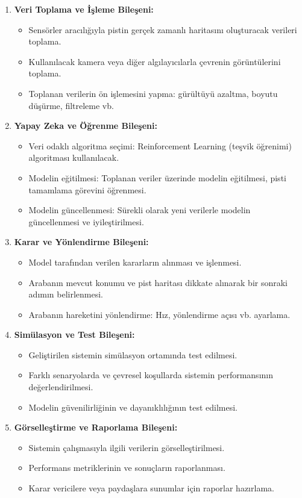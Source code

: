 \begin{enumerate}[label=\textbf{\arabic*.}]
  \item \textbf{Veri Toplama ve İşleme Bileşeni:}
    \begin{itemize}
        \item Sensörler aracılığıyla pistin gerçek zamanlı haritasını oluşturacak verileri toplama.
        \item Kullanılacak kamera veya diğer algılayıcılarla çevrenin görüntülerini toplama.
        \item Toplanan verilerin ön işlemesini yapma: gürültüyü azaltma, boyutu düşürme, filtreleme vb.
    \end{itemize}
  \item \textbf{Yapay Zeka ve Öğrenme Bileşeni:}
    \begin{itemize}
        \item Veri odaklı algoritma seçimi: Reinforcement Learning (teşvik öğrenimi) algoritması kullanılacak.
        \item Modelin eğitilmesi: Toplanan veriler üzerinde modelin eğitilmesi, pisti tamamlama görevini öğrenmesi.
        \item Modelin güncellenmesi: Sürekli olarak yeni verilerle modelin güncellenmesi ve iyileştirilmesi.
    \end{itemize}
  \item \textbf{Karar ve Yönlendirme Bileşeni:}
    \begin{itemize}
        \item Model tarafından verilen kararların alınması ve işlenmesi.
        \item Arabanın mevcut konumu ve pist haritası dikkate alınarak bir sonraki adımın belirlenmesi.
        \item Arabanın hareketini yönlendirme: Hız, yönlendirme açısı vb. ayarlama.
    \end{itemize}
  \item \textbf{Simülasyon ve Test Bileşeni:}
    \begin{itemize}
        \item Geliştirilen sistemin simülasyon ortamında test edilmesi.
        \item Farklı senaryolarda ve çevresel koşullarda sistemin performansının değerlendirilmesi.
        \item Modelin güvenilirliğinin ve dayanıklılığının test edilmesi.
    \end{itemize}
  \item \textbf{Görselleştirme ve Raporlama Bileşeni:}
    \begin{itemize}
        \item Sistemin çalışmasıyla ilgili verilerin görselleştirilmesi.
        \item Performans metriklerinin ve sonuçların raporlanması.
        \item Karar vericilere veya paydaşlara sunumlar için raporlar hazırlama.
    \end{itemize}
\end{enumerate}